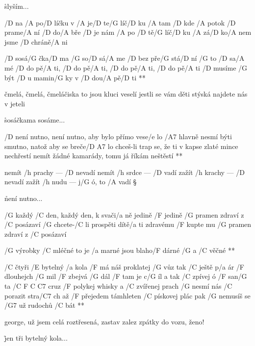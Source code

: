 \r slyším... \songgg




/D na /A po/D líčku v /A je/D te/G líč/D ku
/A tam /D kde /A potok /D prame/A ní
/D do/A bře /D je nám /A po /D tě/G líč/D ku
/A zá/D ko/A nem jsme /D chráně/A ni

\R  /D sosá/G čka/D ma /G so/D sá/A me
    /D bez pře/G stá/D ní /G to /D sa/A mé
    /D do pě/A ti, /D do pě/A ti, /D do pě/A ti, /D do pě/A ti
    /D musíme /G být /D u mamin/G ky v /D dou/A pě/D ti **

čmelá, čmelá, čmeláčiska
to jsou kluci veselí
jestli se vám děti stýská
najdete nás v jeteli

\r sosáčkama sosáme...




\R  /D není nutno, není nutno, aby bylo přímo vese/e lo
    /A7 hlavně nesmí býti smutno, natož aby se breče/{D A7} lo \s
    chceš-li trap se, že ti v kapse zlaté mince nechřestí
    nemít žádné kamarády, tomu já říkám neštěstí **

nemít /h prachy --- /D nevadí
nemít /h srdce --- /D vadí
zažít /h krachy --- /D nevadí
zažít /h nudu --- j/G ó, to /A vadí \S

\r není nutno...




/G každý /C den, každý den, k svači/a ně jedině
/F jedině /G pramen zdraví z /C posázaví
/G chcete-/C li prospěti dítě/a ti zdravému
/F kupte mu /G pramen zdraví z /C posázaví

\R  /G výrobky /C mléčné to je /a marné
    jsou blaho/F dárné /G a /C věčné **




\R /C čtyři /E bytelný /a kola /F má náš proklatej /G vůz
   tak /C ještě p/a ár /F dlouhejch /G mil /F zbejvá /G dál /F tam je c/G íl
   a tak /C zpívej ó /F san/G ta /{C F C C7} cruz
   /F polykej whisky a /C zvířenej prach
   /G nesmí nás /C porazit stra/C7 ch
   až /F přejedem támhleten /C pískovej plác
   pak /G nemusíš se /G7 už rudochů /C bát **

george, už jsem celá roztřesená, zastav
zalez zpátky do vozu, ženo!

\r jen tři bytelný kola...

